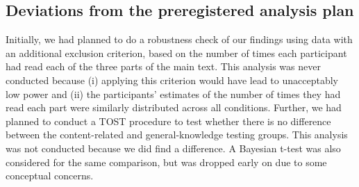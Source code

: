 \documentclass[../main.tex]{subfiles}
\begin{document}
\hypertarget{deviations-from-the-preregistered-analysis-plan}{%
\subsection{Deviations from the preregistered analysis
plan}\label{deviations-from-the-preregistered-analysis-plan}}

Initially, we had planned to do a robustness check of our findings using
data with an additional exclusion criterion, based on the number of
times each participant had read each of the three parts of the main
text. This analysis was never conducted because (i) applying this
criterion would have lead to unacceptably low power and (ii) the
participants' estimates of the number of times they had read each part
were similarly distributed across all conditions. Further, we had
planned to conduct a TOST procedure to test whether there is no
difference between the content-related and general-knowledge testing
groups. This analysis was not conducted because we did find a
difference. A Bayesian t-test was also considered for the same
comparison, but was dropped early on due to some conceptual concerns.
\end{document}
